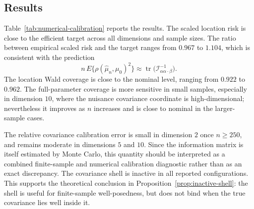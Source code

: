\documentclass[11pt]{article}
\DeclareMathOperator{\tr}{tr}
\newcommand{\info}{\mathcal{I}}
\begin{document}
\subsection{Results}

Table~\ref{tab:numerical-calibration} reports the results. The scaled location risk is close to the efficient target across all dimensions and sample sizes. The ratio between empirical scaled risk and the target ranges from \(0.967\) to \(1.104\), which is consistent with the prediction
\[
n\,E\{\rho(\hat\mu_n,\mu_0)^2\}
\approx
\tr\bigl(\info_{\alpha\alpha\cdot\beta}^{-1}\bigr).
\]
The location Wald coverage is close to the nominal level, ranging from \(0.922\) to \(0.962\). The full-parameter coverage is more sensitive in small samples, especially in dimension \(10\), where the nuisance covariance coordinate is high-dimensional; nevertheless it improves as \(n\) increases and is close to nominal in the larger-sample cases.

The relative covariance calibration error is small in dimension \(2\) once \(n\ge 250\), and remains moderate in dimensions \(5\) and \(10\). Since the information matrix is itself estimated by Monte Carlo, this quantity should be interpreted as a combined finite-sample and numerical calibration diagnostic rather than as an exact discrepancy. The covariance shell is inactive in all reported configurations. This supports the theoretical conclusion in Proposition~\ref{prop:inactive-shell}: the shell is useful for finite-sample well-posedness, but does not bind when the true covariance lies well inside it.
\end{document}
